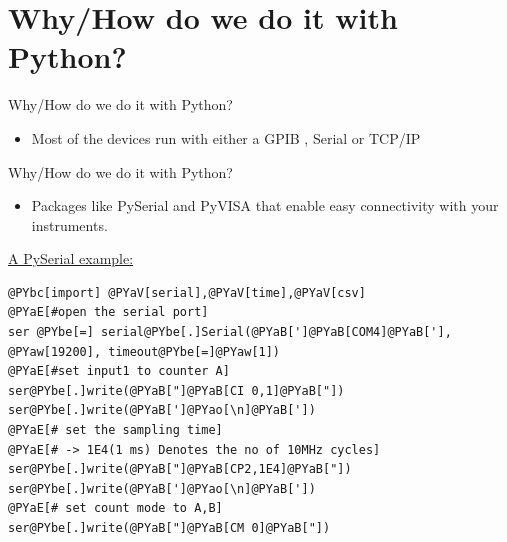 \documentclass{beamer}
\begin{document}
\section{Why/How do we do it with Python?}
\begin{frame}{Why/How do we do it with Python?}
 \begin{block}{}
  \begin{itemize}
   \item Most of the devices run with either a GPIB , Serial or TCP/IP
  \end{itemize}
 \end{block}
\end{frame}
\begin{frame}[fragile]{Why/How do we do it with Python?}
\begin{itemize}
 \item Packages like PySerial and PyVISA that enable easy connectivity with your instruments.
\end{itemize}
\underline{A PySerial example:}
\begin{Verbatim}[commandchars=@\[\]]                                               
@PYbc[import] @PYaV[serial],@PYaV[time],@PYaV[csv]                       
@PYaE[#open the serial port]                                                       
ser @PYbe[=] serial@PYbe[.]Serial(@PYaB[']@PYaB[COM4]@PYaB['], @PYaw[19200], timeout@PYbe[=]@PYaw[1])
@PYaE[#set input1 to counter A]                                                                      
ser@PYbe[.]write(@PYaB["]@PYaB[CI 0,1]@PYaB["])                                                      
ser@PYbe[.]write(@PYaB[']@PYao[\n]@PYaB['])                                                          
@PYaE[# set the sampling time]                                                                       
@PYaE[# -> 1E4(1 ms) Denotes the no of 10MHz cycles]                                                 
ser@PYbe[.]write(@PYaB["]@PYaB[CP2,1E4]@PYaB["])                                                     
ser@PYbe[.]write(@PYaB[']@PYao[\n]@PYaB['])                                                          
@PYaE[# set count mode to A,B]                                                                       
ser@PYbe[.]write(@PYaB["]@PYaB[CM 0]@PYaB["])                                                        
\end{Verbatim}
\end{frame}
\end{document}
